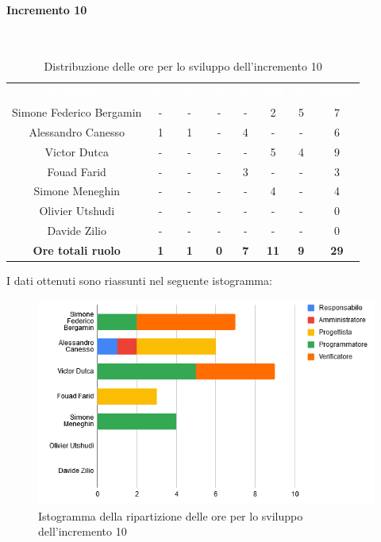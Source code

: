 \paragraph*{Incremento 10}\mbox{} \\
\begin{table}[H]
\centering\renewcommand{\arraystretch}{1.5}
\caption{Distribuzione delle ore per lo sviluppo dell'incremento 10}
\vspace{0.2cm}
\begin{tabular}{ c c c c c c c c }
\rowcolor{redafk}
\textcolor{white}{\textbf{Nominativo}} & \textcolor{white}{\textbf{Re}} &
\textcolor{white}{\textbf{Am}} & \textcolor{white}{\textbf{An}} &
\textcolor{white}{\textbf{Pt}} & \textcolor{white}{\textbf{Pm}} &
\textcolor{white}{\textbf{Ve}} & \textcolor{white}{\textbf{Totale}} \\
Simone Federico Bergamin & - & - & - & - & 2 & 5 & 7 \\
Alessandro Canesso & 1 & 1 & - & 4 & - & - & 6 \\
Victor Dutca & - & - & - & - & 5 & 4 & 9 \\
Fouad Farid & - & - & - & 3 & - & - & 3  \\
Simone Meneghin & - & - & - & - & 4 & - & 4 \\
Olivier Utshudi & - & - & - & - & - & - & 0 \\
Davide Zilio & - & - & - & - & - & - & 0 \\
\rowcolor{lastrowcolor}
\textbf{Ore totali ruolo} & \textbf{1} & \textbf{1} & \textbf{0} & \textbf{7} & \textbf{11} & \textbf{9} & \textbf{29} \\
\end{tabular}
\end{table}

I dati ottenuti sono riassunti nel seguente istogramma:
\begin{figure}[H]
\centering
\includegraphics[scale=0.60]{img/grafici/tabella_inc10.png}
\caption{Istogramma della ripartizione delle ore per lo sviluppo dell'incremento 10}
\end{figure}

